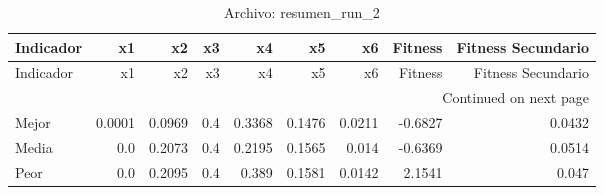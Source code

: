 \begin{longtable}{lrrrrrrrr}
\caption{Archivo: resumen\_run\_2}\label{tab:resumen_run_2} \\
\toprule
Indicador & x1 & x2 & x3 & x4 & x5 & x6 & Fitness & Fitness Secundario \\
\midrule
\endfirsthead
\toprule
Indicador & x1 & x2 & x3 & x4 & x5 & x6 & Fitness & Fitness Secundario \\
\midrule
\endhead
\midrule
\multicolumn{9}{r}{Continued on next page} \\
\midrule
\endfoot
\bottomrule
\endlastfoot
Mejor & 0.0001 & 0.0969 & 0.4 & 0.3368 & 0.1476 & 0.0211 & -0.6827 & 0.0432 \\
Media & 0.0 & 0.2073 & 0.4 & 0.2195 & 0.1565 & 0.014 & -0.6369 & 0.0514 \\
Peor & 0.0 & 0.2095 & 0.4 & 0.389 & 0.1581 & 0.0142 & 2.1541 & 0.047 \\
\end{longtable}